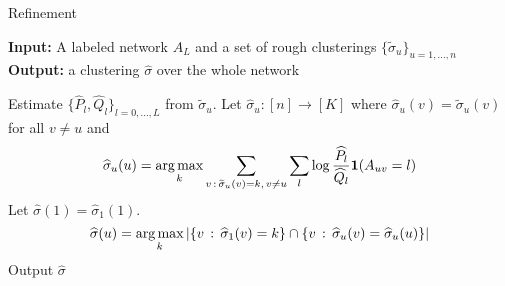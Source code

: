 \begin{algorithm}
\caption{Refinement}
\label{alg:refinement}
\textbf{Input:} A labeled network $A_L$ and a set of rough clusterings $\{\tilde{\sigma}_u\}_{u=1,...,n}$ \\
\textbf{Output:} a clustering $\hat{\sigma}$ over the whole network

\begin{algorithmic}[1]
   \State Estimate $\{ \hat{P}_l, \hat{Q}_l\}_{l=0,...,L}$ from $\tilde{\sigma}_u$.
   \State Let $\hat{\sigma}_u : [n] \rightarrow [K]$ where 
       $\hat{\sigma}_u(v) = \tilde{\sigma}_u(v)$ for all $v \neq u$ and 
   \[
    \widehat{\sigma}_u(u) = \mathop{\text{\rm arg\,max}}_k \sum_{v \,:\, \widetilde{\sigma}_u(v) = k ,\, v\neq u} 
         \sum_l \log \frac{\widehat{P}_l}{\widehat{Q}_l} \mbox{\boldmath $1$}(A_{uv} = l) 
     \]    
\EndFor 
\State Let $\hat{\sigma}(1) = \hat{\sigma}_1(1)$.  
\[
\widehat{\sigma}(u) = \mathop{\text{\rm arg\,max}}_k | \{ v \,:\,  \widehat{\sigma}_1(v) = k \} \cap
                                 \{ v \,:\, \widehat{\sigma}_u(v) = \widehat{\sigma}_u(u) \}|
\]
\EndFor
\State Output $\hat{\sigma}$
\end{algorithmic}

\end{algorithm}


